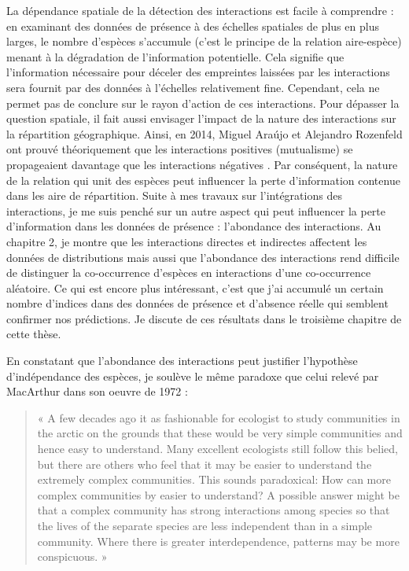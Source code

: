 La dépendance spatiale de la détection des interactions est facile à
comprendre : en examinant des données de présence à des échelles
spatiales de plus en plus larges, le nombre d'espèces s'accumule (c'est
le principe de la relation aire-espèce) menant à la dégradation de
l'information potentielle. Cela signifie que l'information nécessaire
pour déceler des empreintes laissées par les interactions sera fournit
par des données à l'échelles relativement fine. Cependant, cela ne
permet pas de conclure sur le rayon d'action de ces interactions. Pour
dépasser la question spatiale, il fait aussi envisager l'impact de la
nature des interactions sur la répartition géographique. Ainsi, en 2014,
Miguel Araújo et Alejandro Rozenfeld ont prouvé théoriquement que les
interactions positives (mutualisme) se propageaient davantage que les
interactions négatives \citep{Araujo2014}. Par conséquent, la nature de
la relation qui unit des espèces peut influencer la perte d'information
contenue dans les aire de répartition. Suite à mes travaux sur
l'intégrations des interactions, je me suis penché sur un autre aspect
qui peut influencer la perte d'information dans les données de présence
: l'abondance des interactions. Au chapitre 2, je montre que les
interactions directes et indirectes affectent les données de
distributions mais aussi que l'abondance des interactions rend difficile
de distinguer la co-occurrence d'espèces en interactions d'une
co-occurrence aléatoire. Ce qui est encore plus intéressant, c'est que
j'ai accumulé un certain nombre d'indices dans des données de présence
et d'absence réelle qui semblent confirmer nos prédictions. Je discute
de ces résultats dans le troisième chapitre de cette thèse.

En constatant que l'abondance des interactions peut justifier
l'hypothèse d'indépendance des espèces, je soulève le même paradoxe que
celui relevé par MacArthur dans son oeuvre de 1972
\citep{macarthur1972geographical} :

\begin{quote}
« A few decades ago it as fashionable for ecologist to study communities
in the arctic on the grounds that these would be very simple communities
and hence easy to understand. Many excellent ecologists still follow
this belied, but there are others who feel that it may be easier to
understand the extremely complex communities. This sounds paradoxical:
How can more complex communities by easier to understand? A possible
answer might be that a complex community has strong interactions among
species so that the lives of the separate species are less independent
than in a simple community. Where there is greater interdependence,
patterns may be more conspicuous. »
\end{quote}

